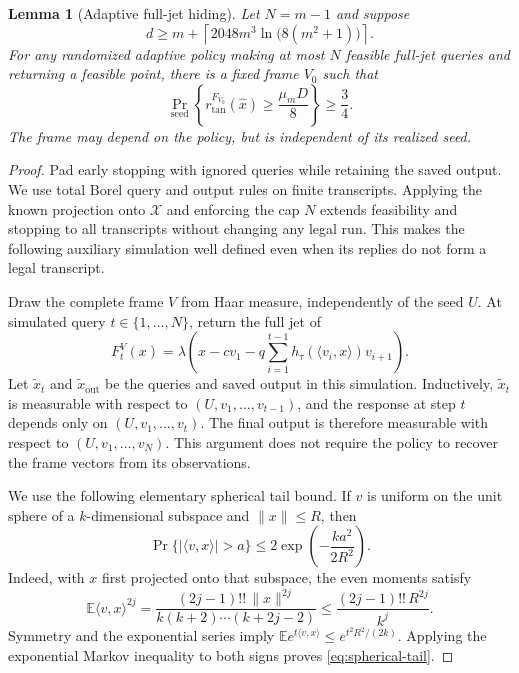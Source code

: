 \documentclass[11pt]{article}
\numberwithin{equation}{section}
\newtheorem{lemma}[theorem]{Lemma}
\theoremstyle{definition}
\theoremstyle{remark}
\begin{document}
\begin{lemma}[Adaptive full-jet hiding]\label{lem:adaptive-hiding}
Let $N=m-1$ and suppose
\begin{equation}\label{eq:lower-dimension}
d\ge m+
\left\lceil2048m^3\ln\bigl(8(m^2+1)\bigr)\right\rceil.
\end{equation}
For any randomized adaptive policy making at most $N$ feasible full-jet
queries and returning a feasible point, there is a fixed frame $V_0$
such that
\[
\Pr_{\mathrm{seed}}\!\left\{
r_{\mathrm{tan}}^{F_{V_0}}(\widehat x)
\ge\frac{\mu_mD}{8}\right\}\ge\frac34.
\]
The frame may depend on the policy, but is independent of its realized
seed.
\end{lemma}

\begin{proof}
Pad early stopping with ignored queries while retaining the saved output.
We use total Borel query and output rules on finite transcripts. Applying
the known projection onto $\mathcal X$ and enforcing the cap $N$ extends
feasibility and stopping to all transcripts without changing any legal
run. This makes the following auxiliary simulation well defined even
when its replies do not form a legal transcript.

Draw the complete frame $V$ from Haar measure, independently of the seed
$U$. At simulated query $t\in\{1,\ldots,N\}$, return the full jet of
\[
F_t^V(x)=\lambda\left(
x-cv_1-q\sum_{i=1}^{t-1}
h_\tau(\langle v_i,x\rangle)v_{i+1}\right).
\]
Let $\widetilde x_t$ and $\widetilde x_{\mathrm{out}}$ be the queries
and saved output in this simulation. Inductively,
$\widetilde x_t$ is measurable with respect to
$(U,v_1,\ldots,v_{t-1})$, and the response at step $t$ depends only on
$(U,v_1,\ldots,v_t)$. The final output is therefore measurable with
respect to $(U,v_1,\ldots,v_N)$. This argument does not require the
policy to recover the frame vectors from its observations.

We use the following elementary spherical tail bound. If $v$ is uniform
on the unit sphere of a $k$-dimensional subspace and $\|x\|\le R$, then
\begin{equation}\label{eq:spherical-tail}
\Pr\{|\langle v,x\rangle|>a\}
\le2\exp\!\left(-\frac{ka^2}{2R^2}\right).
\end{equation}
Indeed, with $x$ first projected onto that subspace, the even moments
satisfy
\[
\mathbb E\langle v,x\rangle^{2j}
=\frac{(2j-1)!!\,\|x\|^{2j}}
 {k(k+2)\cdots(k+2j-2)}
\le\frac{(2j-1)!!\,R^{2j}}{k^j}.
\]
Symmetry and the exponential series imply
$\mathbb E e^{t\langle v,x\rangle}\le e^{t^2R^2/(2k)}$.
Applying the exponential Markov inequality to both signs proves
\eqref{eq:spherical-tail}.


\end{proof}
\end{document}

